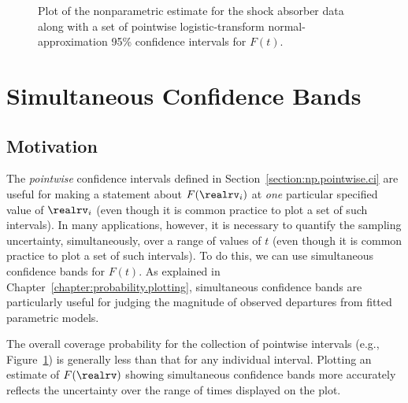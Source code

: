 \begin{figure}
\caption{Plot of the nonparametric estimate
for the shock absorber data along with a set of pointwise
logistic-transform normal-approximation 95\% confidence intervals for
$F(t)$.}
\label{figure:shockabsB.cdf.pw.ps}
\end{figure}

\section{Simultaneous Confidence Bands}
\label{section:np.simultaneous.cb}

\subsection{Motivation}
The {\em pointwise} confidence intervals defined in
Section~\ref{section:np.pointwise.ci} are useful for making a
statement about $F(\realrv_{i})$ at {\em one} particular specified
value of $\realrv_{i}$ (even though it is common practice to plot a
set of such intervals). In many applications, however, it is
necessary to quantify the sampling uncertainty, simultaneously, over
a range of values of $t$ (even though it is common practice to plot
a set of such intervals).  To do this, we can use simultaneous
confidence bands for $F(t)$. As explained in
Chapter~\ref{chapter:probability.plotting}, simultaneous confidence
bands are particularly useful for judging the magnitude of observed
departures from fitted parametric models.

The overall coverage probability
for the collection of pointwise intervals 
(e.g., Figure~\ref{figure:shockabsB.cdf.pw.ps}) is generally less than 
that for any individual interval.
Plotting an estimate of $F(\realrv)$ showing
simultaneous confidence bands more accurately reflects
the uncertainty over the range of times displayed on the plot.

